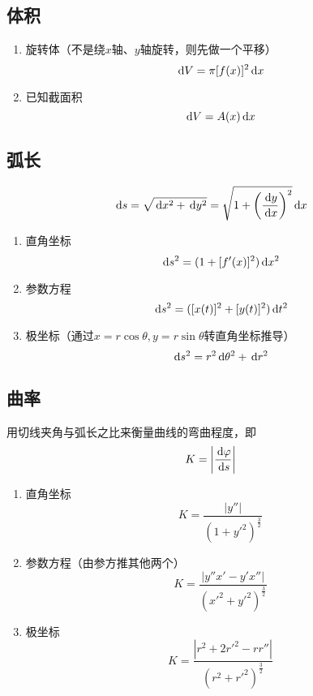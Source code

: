 \subsection{体积}
\begin{enumerate}
	\item 旋转体（不是绕$x$轴、$y$轴旋转，则先做一个平移）
\[\,\mathrm{d} V=\pi[f(x)]^2\,\mathrm{d} x\]
	\item 已知截面积
\[\,\mathrm{d} V=A(x)\,\mathrm{d} x\]
\end{enumerate}

\subsection{弧长}
\begin{center}
\end{center}
\[\,\mathrm{d} s=\sqrt{\,\mathrm{d} x^2+\,\mathrm{d} y^2}=\sqrt{1+\left(\dfrac{\,\mathrm{d} y}{\,\mathrm{d} x}\right)^2}\,\mathrm{d} x\]
\begin{enumerate}
	\item 直角坐标
	\[\,\mathrm{d} s^2=(1+[f'(x)]^2)\,\mathrm{d} x^2\]
	\item 参数方程
	\[\,\mathrm{d} s^2=([x(t)]^2+[y(t)]^2)\,\mathrm{d} t^2\]
	\item 极坐标（通过$x=r\cos\theta,y=r\sin\theta$转直角坐标推导）
	\[\,\mathrm{d} s^2=r^2\,\mathrm{d}\theta^2+\,\mathrm{d} r^2\]
\end{enumerate}

\subsection{曲率}
\begin{definition}[曲率]
用切线夹角与弧长之比来衡量曲线的弯曲程度，即
\[K=\left|\dfrac{\,\mathrm{d}\varphi}{\,\mathrm{d} s}\right|\]
\end{definition}
\begin{enumerate}
	\item 直角坐标
	\[K=\dfrac{|y''|}{(1+y'^2)^\frac{3}{2}}\]
	\item 参数方程（由参方推其他两个）
	\[K=\dfrac{|y''x'-y'x''|}{(x'^2+y'^2)^\frac{3}{2}}\]
	\item 极坐标
	\[K=\dfrac{|r^2+2r'^2-rr''|}{(r^2+r'^2)^\frac{3}{2}}\]
\end{enumerate}

